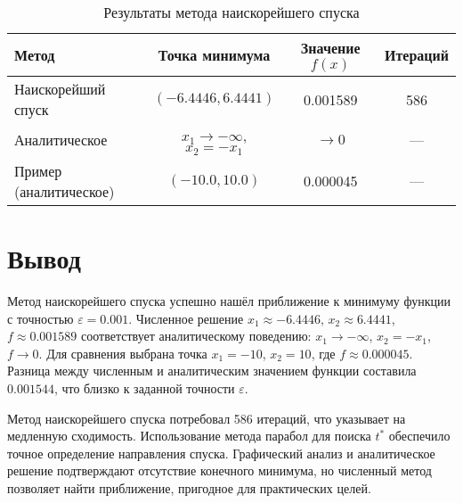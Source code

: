 \documentclass[a4paper, 14pt]{extarticle}
\begin{document}
\begin{table}[H]
    \centering
    \caption{Результаты метода наискорейшего спуска}
    \begin{tabular}{lccc}
    \toprule
    Метод & Точка минимума & Значение \( f(x) \) & Итераций \\
    \midrule
    Наискорейший спуск & \( (-6.4446, 6.4441) \) & 0.001589 & 586 \\
    Аналитическое & \( x_1 \to -\infty \), \( x_2 = -x_1 \) & \( \to 0 \) & — \\
    Пример (аналитическое) & \( (-10.0, 10.0) \) & 0.000045 & — \\
    \bottomrule
    \end{tabular}
    \label{tab:results}
\end{table}

\section{Вывод}

Метод наискорейшего спуска успешно нашёл приближение к минимуму функции с точностью \( \varepsilon = 0.001 \). 
Численное решение \( x_1 \approx -6.4446 \), \( x_2 \approx 6.4441 \), \( f \approx 0.001589 \) соответствует аналитическому поведению: 
\( x_1 \to -\infty \), \( x_2 = -x_1 \), \( f \to 0 \). Для сравнения выбрана точка \( x_1 = -10 \), \( x_2 = 10 \), где \( f \approx 0.000045 \). 
Разница между численным и аналитическим значением функции составила \( 0.001544 \), что близко к заданной точности \( \varepsilon \).

Метод наискорейшего спуска потребовал 586 итераций, что указывает на медленную сходимость. Использование метода парабол для поиска \( t^* \) обеспечило 
точное определение направления спуска. 
Графический анализ и аналитическое решение подтверждают отсутствие конечного минимума, но численный метод позволяет найти приближение, пригодное для 
практических целей.
\end{document}
